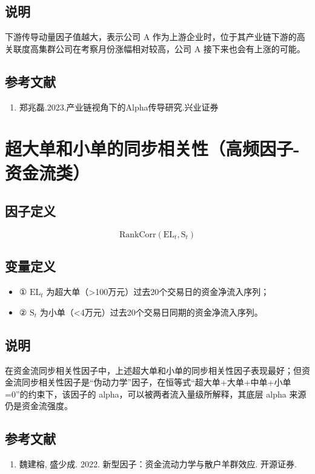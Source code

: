 \documentclass{article}
\begin{document}
\subsection{说明}
下游传导动量因子值越大，表示公司 A 作为上游企业时，位于其产业链下游的高关联度高集群公司在考察月份涨幅相对较高，公司 A 接下来也会有上涨的可能。

\subsection{参考文献}
\begin{enumerate}
    \item 郑兆磊.2023.产业链视角下的Alpha传导研究.兴业证券
\end{enumerate}

\section{超大单和小单的同步相关性（高频因子-资金流类）}

\subsection{因子定义}

\begin{equation}
    \mathrm{RankCorr}(\mathrm{EL}_t, \mathrm{S}_t)
\end{equation}

\subsection{变量定义}
\begin{itemize}
    \item ① \( \mathrm{EL}_t \) 为超大单（>100万元）过去20个交易日的资金净流入序列；
    \item ② \( \mathrm{S}_t \) 为小单（<4万元）过去20个交易日同期的资金净流入序列。
\end{itemize}

\subsection{说明}
在资金流同步相关性因子中，上述超大单和小单的同步相关性因子表现最好；但资金流同步相关性因子是“伪动力学”因子，在恒等式“超大单+大单+中单+小单=0”的约束下，该因子的 alpha，可以被两者流入量级所解释，其底层 alpha 来源仍是资金流强度。

\subsection{参考文献}
\begin{enumerate}
    \item 魏建榕, 盛少成. 2022. 新型因子：资金流动力学与散户羊群效应. 开源证券.
\end{enumerate}
\end{document}
